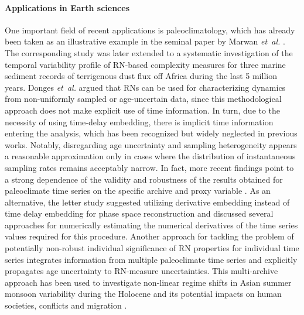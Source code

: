 		\paragraph{Applications in Earth sciences}
		One important field of recent applications is paleoclimatology, which has already been taken as an illustrative example in the seminal paper by Marwan \textit{et~al.} \cite{Marwan2009}. The corresponding study was later extended to a systematic investigation of the temporal variability profile of RN-based complexity measures for three marine sediment records of terrigenous dust flux off Africa during the last 5 million years. Donges \textit{et~al.} \cite{Donges2011,Donges2011a} argued that RNs can be used for characterizing dynamics from non-uniformly sampled or age-uncertain data, since this methodological approach does not make explicit use of time information. In turn, due to the necessity of using time-delay embedding, there is implicit time information entering the analysis, which has been recognized but widely neglected in previous works. Notably, disregarding age uncertainty and sampling heterogeneity appears a reasonable approximation only in cases where the distribution of instantaneous sampling rates remains acceptably narrow. In fact, more recent findings point to a strong dependence of the validity and robustness of the results obtained for paleoclimate time series on the specific archive and proxy variable \cite{Lekscha2018}. As an alternative, the letter study suggested utilizing derivative embedding instead of time delay embedding for phase space reconstruction and discussed several approaches for numerically estimating the numerical derivatives of the time series values required for this procedure. Another approach for tackling the problem of potentially non-robust individual significance of RN properties for individual time series integrates information from multiple paleoclimate time series and explicitly propagates age uncertainty to RN-measure uncertainties. This multi-archive approach has been used to investigate non-linear regime shifts in Asian summer monsoon variability during the Holocene and its potential impacts on human societies, conflicts and migration \cite{donges2015nonlinear}.


